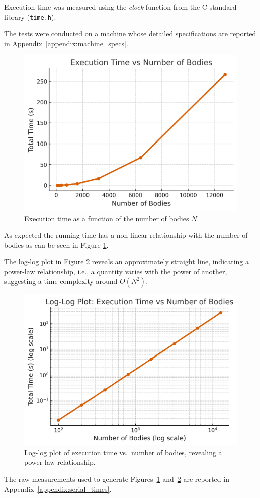 \documentclass{article}
\begin{document}
Execution time was measured using the \emph{clock} function from the C standard library (\texttt{time.h}).  

The tests were conducted on a machine whose detailed specifications are reported in Appendix~\ref{appendix:machine_specs}.

\begin{figure}[H]
    \centering
    \includegraphics[width=0.6\linewidth]{ex_time_vs_bodies.png}
    \caption{Execution time as a function of the number of bodies $N$.}
    \label{fig:ex_time}
\end{figure}
As expected the running time has a non-linear relationship with the number of bodies as can be seen in Figure \ref{fig:ex_time}.

The log-log plot in Figure \ref{fig:logex_time} reveals an approximately straight line, indicating a power-law relationship, i.e., a quantity varies with the power of another, suggesting a time complexity around $O(N^2)$.

\begin{figure}[H]
    \centering
    \includegraphics[width=0.6\linewidth]{logex_time_vs_logbodies.png}
    \caption{Log-log plot of execution time vs.\ number of bodies, revealing a power-law relationship.}
    \label{fig:logex_time}
\end{figure}
The raw measurements used to generate Figures~\ref{fig:ex_time} and~\ref{fig:logex_time} are reported in Appendix~\ref{appendix:serial_times}.
\end{document}
